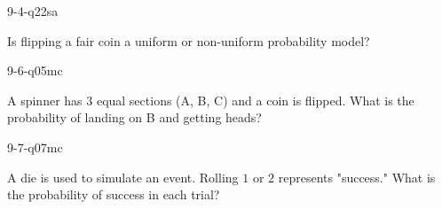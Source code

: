 \begin{practiceQuestion}{9-4-q22}{sa}
\begin{questionText}
Is flipping a fair coin a uniform or non-uniform probability model?
\end{questionText}
\end{practiceQuestion}

\begin{practiceQuestion}{9-6-q05}{mc}
\begin{questionText}
A spinner has $3$ equal sections (A, B, C) and a coin is flipped. What is the probability of landing on B and getting heads?
\end{questionText}
\end{practiceQuestion}

\begin{practiceQuestion}{9-7-q07}{mc}
\begin{questionText}
A die is used to simulate an event. Rolling $1$ or $2$ represents "success." What is the probability of success in each trial?
\end{questionText}
\end{practiceQuestion}
